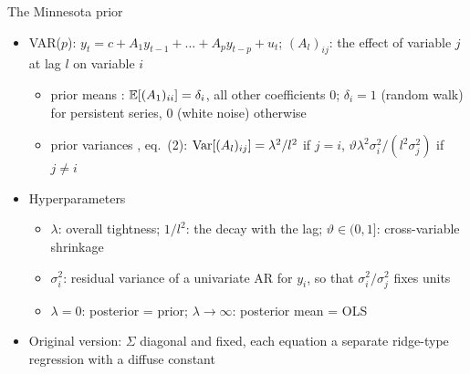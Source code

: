 \begin{frame}{The Minnesota prior}
\itemsize{\small}
\begin{itemize}
    \item VAR($p$): $y_t = c + A_1y_{t-1} + \dots + A_py_{t-p} + u_t$; $(A_l)_{ij}$: the effect of variable $j$ at lag $l$ on variable $i$
    \begin{itemize}
        \item prior means : $\mathbb{E}[(A_1)_{ii}] = \delta_i$, all other coefficients 0; $\delta_i = 1$ (random walk) for persistent series, 0 (white noise) otherwise
        \item prior variances , eq.~(2): $\text{Var}[(A_l)_{ij}] = \lambda^2/l^2$ if $j = i$, $\vartheta\lambda^2\sigma_i^2/(l^2\sigma_j^2)$ if $j \ne i$
    \end{itemize}
    \item Hyperparameters
    \begin{itemize}
        \item $\lambda$: overall tightness; $1/l^2$: the decay with the lag; $\vartheta \in (0, 1]$: cross-variable shrinkage
        \item $\sigma_i^2$: residual variance of a univariate AR for $y_i$, so that $\sigma_i^2/\sigma_j^2$ fixes units
        \item $\lambda = 0$: posterior = prior; $\lambda \to \infty$: posterior mean = OLS
    \end{itemize}
    \item Original version: $\Sigma$ diagonal and fixed, each equation a separate ridge-type regression with a diffuse constant
\end{itemize}
\end{frame}

